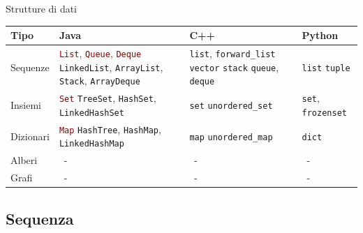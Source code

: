 \begin{frame}{Strutture di dati}
  
{\footnotesize
\begin{tabular}{|P{1.5cm}|P{2.9cm}|P{2.9cm}|P{2.9cm}|}
\hline
\textbf{Tipo} & \textbf{Java} & \textbf{C++} & \textbf{Python} \\
\hline
\alert{Sequenze} & \textcolor{DarkRed}{\texttt{List}, \texttt{Queue}, \texttt{Deque}}
\newline \texttt{LinkedList}, \texttt{ArrayList}, \texttt{Stack}, \texttt{ArrayDeque}
&  
\texttt{list}, \texttt{forward\_list} \newline \texttt{vector} \newline \texttt{stack} \newline \texttt{queue}, \texttt{deque} &
\texttt{list} \newline \texttt{tuple} \\
\hline
\alert{Insiemi} & \textcolor{DarkRed}{\texttt{Set}} \newline\texttt{TreeSet}, \texttt{HashSet}, \texttt{LinkedHashSet} & \texttt{set} \newline \texttt{unordered\_set} & \texttt{set}, \texttt{frozenset}  \\
\hline
\alert{Dizionari} & \textcolor{DarkRed}{\texttt{Map}} \newline \texttt{HashTree}, \texttt{HashMap}, \texttt{LinkedHashMap} & \texttt{map} \newline \texttt{unordered\_map} & \texttt{dict} \\
\hline 
\alert{Alberi}\newline & ~\newline- & ~\newline- & ~\newline- \\
\hline
\alert{Grafi}\newline & ~\newline- & ~\newline- & ~\newline- \\
\hline
\end{tabular}
}

\end{frame}

\subsection{Sequenza}

